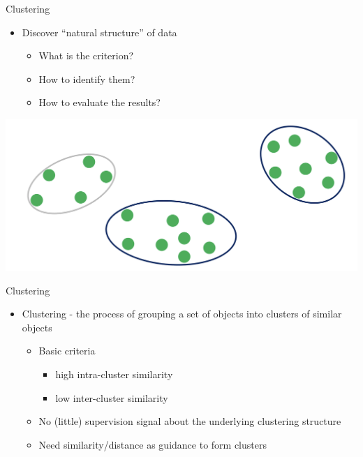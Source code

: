 \documentclass[
  ignorenonframetext,
]{beamer}
\providecommand{\tightlist}{%
  \setlength{\itemsep}{0pt}\setlength{\parskip}{0pt}}
\begin{document}
\begin{frame}{Clustering}
\protect\hypertarget{clustering}{}
\begin{itemize}
\item
  Discover ``natural structure'' of data

  \begin{itemize}
  \tightlist
  \item
    What is the criterion?
  \item
    How to identify them?
  \item
    How to evaluate the results?
  \end{itemize}
\end{itemize}

\includegraphics[width=1\linewidth]{img/page 5}
\end{frame}

\begin{frame}{Clustering}
\protect\hypertarget{clustering-1}{}
\begin{itemize}
\item
  Clustering - the process of grouping a set of objects into clusters of
  similar objects

  \begin{itemize}
  \item
    Basic criteria

    \begin{itemize}
    \item
      high intra-cluster similarity
    \item
      low inter-cluster similarity
    \end{itemize}
  \item
    No (little) supervision signal about the underlying clustering
    structure
  \item
    Need similarity/distance as guidance to form clusters
  \end{itemize}
\end{itemize}
\end{frame}
\end{document}
